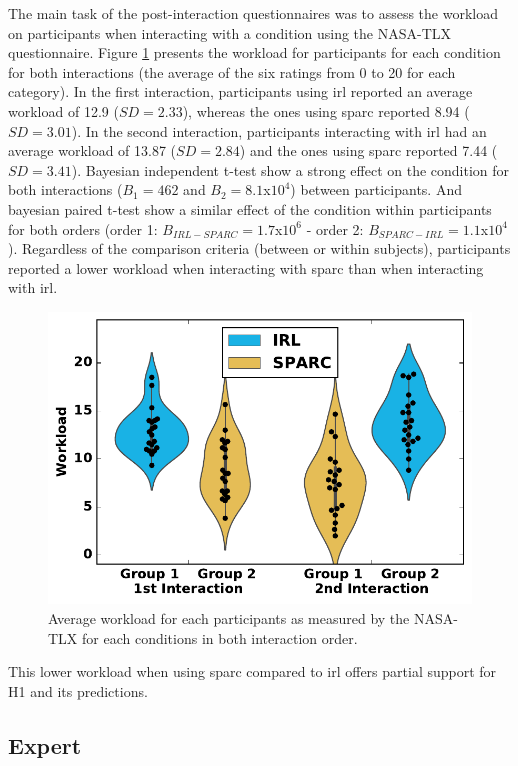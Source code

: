 The main task of the post-interaction questionnaires was to assess the workload on participants when interacting with a condition using the NASA-TLX questionnaire. Figure \ref{fig:control_workload} presents the workload for participants for each condition for both interactions (the average of the six ratings from 0 to 20 for each category). In the first interaction, participants using \gls{irl} reported an average workload of 12.9 ($SD=2.33$), whereas the ones using \gls{sparc} reported 8.94 ($SD=3.01$). In the second interaction, participants interacting with \gls{irl} had an average workload of 13.87 ($SD=2.84$) and the ones using \gls{sparc} reported 7.44 ($SD=3.41$). Bayesian independent t-test show a strong effect on the condition for both interactions ($B_1=462$ and $B_2=8.1$x$10^4$) between participants. And bayesian paired t-test show a similar effect of the condition within participants for both orders (order 1: $B_{IRL-SPARC}=1.7$x$10^6$ - order 2: $B_{SPARC-IRL}=1.1$x$10^4$). Regardless of the comparison criteria (between or within subjects), participants reported a lower workload when interacting with \gls{sparc} than when interacting with \gls{irl}.

\begin{figure}[ht]
	\includegraphics[width=.5\textwidth]{workload.pdf}
	\centering
	\caption{Average workload for each participants as measured by the NASA-TLX for each conditions in both interaction order.
	}
	\label{fig:control_workload}
\end{figure}

This lower workload when using \gls{sparc} compared to \gls{irl} offers partial support for H1 and its predictions.

\subsection{Expert} \label{ssec:control_expert}

